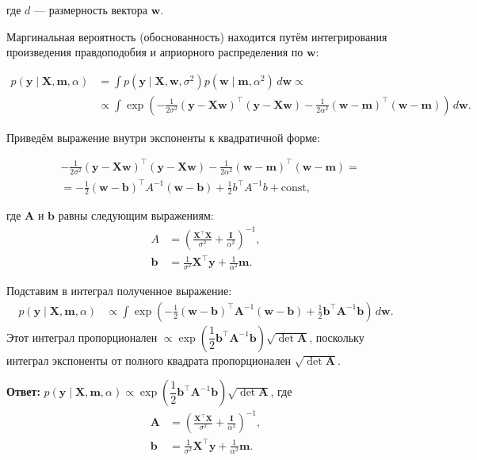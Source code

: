 где $d$ — размерность вектора $\mathbf{w}$.

Маргинальная вероятность (обоснованность) находится путём интегрирования произведения правдоподобия и априорного распределения по $\mathbf{w}$:

\begin{align*}
 p(\mathbf{y} \mid \mathbf{X}, \mathbf{m}, \alpha) &= \int p(\mathbf{y} \mid \mathbf{X}, \mathbf{w}, \sigma^2) p(\mathbf{w} \mid \mathbf{m}, \alpha^2) \, d\mathbf{w} \propto \\
 &\propto \int \exp\left(-\frac{1}{2\sigma^2}(\mathbf{y} - \mathbf{X}\mathbf{w})^\top(\mathbf{y} - \mathbf{X}\mathbf{w}) - \frac{1}{2\alpha^2}(\mathbf{w} - \mathbf{m})^\top(\mathbf{w} - \mathbf{m})\right) \, d\mathbf{w}.
\end{align*}

Приведём выражение внутри экспоненты к квадратичной форме:

\begin{align*}
 &-\frac{1}{2\sigma^2}(\mathbf{y} - \mathbf{X}\mathbf{w})^\top(\mathbf{y} - \mathbf{X}\mathbf{w}) - \frac{1}{2\alpha^2}(\mathbf{w} - \mathbf{m})^\top(\mathbf{w} - \mathbf{m})= \\
 &= -\frac{1}{2}(\mathbf{w} - \mathbf{b})^\top A^{-1} (\mathbf{w} - \mathbf{b}) + \frac{1}{2} b^\top A^{-1} b + \text{const},
\end{align*}

где $\mathbf{A}$ и $\mathbf{b}$ равны следующим выражениям:
\begin{align*}
 A &= \left(\frac{\mathbf{X}^\top \mathbf{X}}{\sigma^2} + \frac{\mathbf{I}}{\alpha^2}\right)^{-1},\\
 \mathbf{b} &= \frac{1}{\sigma^2} \mathbf{X}^\top \mathbf{y} + \frac{1}{\alpha^2} \mathbf{m}.
\end{align*}

Подставим в интеграл полученное выражение:
\begin{align*}
 p(\mathbf{y} \mid \mathbf{X}, \mathbf{m}, \alpha) &\propto \int \exp\left(-\frac{1}{2}(\mathbf{w} - \mathbf{b})^\top \mathbf{A}^{-1} (\mathbf{w} - \mathbf{b}) + \frac{1}{2} \mathbf{b}^\top \mathbf{A}^{-1} \mathbf{b} \right) \, d\mathbf{w}.
\end{align*}
Этот интеграл пропорционален $\propto\exp\left(\dfrac{1}{2} \mathbf{b}^\top \mathbf{A}^{-1} \mathbf{b}\right) \sqrt{\det \mathbf{A}}$, поскольку интеграл экспоненты от полного квадрата пропорционален $\sqrt{\det \mathbf{A}}$.

\textbf{Ответ:} $p(\mathbf{y} \mid \mathbf{X}, \mathbf{m}, \alpha) \propto\exp\left(\dfrac{1}{2} \mathbf{b}^\top \mathbf{A}^{-1} \mathbf{b}\right) \sqrt{\det \mathbf{A}}$, где
\begin{align*}
 \mathbf{A} &= \left(\frac{\mathbf{X}^\top \mathbf{X}}{\sigma^2} + \frac{\mathbf{I}}{\alpha^2}\right)^{-1},\\
 \mathbf{b} &= \frac{1}{\sigma^2} \mathbf{X}^\top \mathbf{y} + \frac{1}{\alpha^2} \mathbf{m}.
\end{align*}

